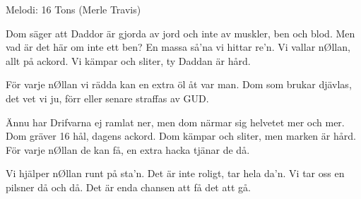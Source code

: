 \begin{song}

\begin{songmeta}
Melodi: 16 Tons (Merle Travis)
\end{songmeta}
\begin{songtext}
Dom säger att Daddor är gjorda av jord
och inte av muskler, ben och blod.
Men vad är det här om inte ett ben?
En massa så'na vi hittar re'n.
Vi vallar nØllan, allt på ackord.
Vi kämpar och sliter, ty Daddan är hård.

För varje nØllan vi rädda kan
en extra öl åt var man.
Dom som brukar djävlas, det vet vi ju,
förr eller senare straffas av GUD.

Ännu har Drifvarna ej ramlat ner,
men dom närmar sig helvetet mer och mer.
Dom gräver 16 hål, dagens ackord.
Dom kämpar och sliter, men marken är hård.
För varje nØllan de kan få,
en extra hacka tjänar de då.

Vi hjälper nØllan runt på sta'n.
Det är inte roligt, tar hela da'n.
Vi tar oss en pilsner då och då.
Det är enda chansen att få det att gå.

\end{songtext}
\end{song}

